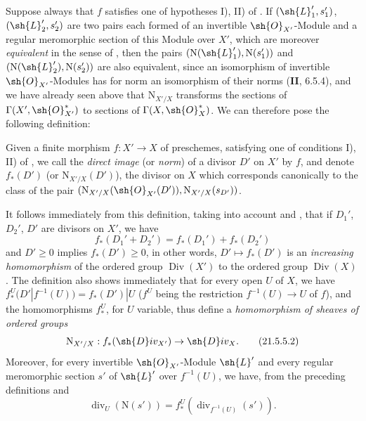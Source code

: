 \begin{env}[21.5.4]
\label{IV.21.5.4}
Suppose always that $f$ satisfies one of hypotheses I), II) of .
If $(\sh{L}_1',s_1')$, $(\sh{L}_2',s_2')$ are two pairs each formed of an invertible $\sh{O}_{X'}$-Module and a regular meromorphic section of this Module over $X'$, which are moreover \emph{equivalent} in the sense of , then the pairs $(\mathrm{N}(\sh{L}_1'),\mathrm{N}(s_1'))$ and $(\mathrm{N}(\sh{L}_2'),\mathrm{N}(s_2'))$ are also equivalent, since an isomorphism of invertible $\sh{O}_{X'}$-Modules has for norm an isomorphism of their norms (\textbf{II}, 6.5.4), and we have already seen above that $\mathrm{N}_{X'/X}$ transforms the sections of $\Gamma(X',\sh{O}_{X'}^*)$ to sections of $\Gamma(X,\sh{O}_X^*)$.
We can therefore pose the following definition:
\end{env}

\begin{definition}[21.5.5]
\label{IV.21.5.5}
Given a finite morphism $f:X'\to X$ of preschemes, satisfying one of conditions I), II) of , we call the \emph{direct image} (or \emph{norm}) of a divisor $D'$ on $X'$ by $f$, and denote $f_*(D')$ (or $\mathrm{N}_{X'/X}(D')$), the divisor on $X$ which corresponds canonically  to the class of the pair $(\mathrm{N}_{X'/X}(\sh{O}_{X'}(D')),\mathrm{N}_{X'/X}(s_{D'}))$.
\end{definition}

It follows immediately from this definition, taking into account  and , that if $D_1'$, $D_2'$, $D'$ are divisors on $X'$, we have
\[
\label{IV.21.5.5.1}
  f_*(D_1'+D_2')=f_*(D_1')+f_*(D_2')
  \tag{21.5.5.1}
\]
and $D'\geq 0$ implies $f_*(D')\geq 0$, in other words, $D'\mapsto f_*(D')$ is an \emph{increasing homomorphism} of the ordered group $\operatorname{Div}(X')$ to the ordered group $\operatorname{Div}(X)$.
The definition  also shows immediately that for every open $U$ of $X$, we have $f_*^U(D'|f^{-1}(U))=f_*(D')|U$ ($f^U$ being the restriction $f^{-1}(U)\to U$ of $f$), and the homomorphisms $f_*^U$, for $U$ variable, thus define a \emph{homomorphism of sheaves of ordered groups}
\[
\label{IV.21.5.5.2}
  \mathrm{N}_{X'/X}:f_*(\sh{D}iv_{X'})\to\sh{D}iv_X.
  \tag{21.5.5.2}
\]
Moreover, for every invertible $\sh{O}_{X'}$-Module $\sh{L}'$ and every regular meromorphic section $s'$ of $\sh{L}'$ over $f^{-1}(U)$, we have, from the preceding definitions and 
\[
\label{IV.21.5.5.3}
  \operatorname{div}_U(\mathrm{N}(s'))=f_*^U(\operatorname{div}_{f^{-1}(U)}(s')).
  \tag{21.5.5.3}
\]

